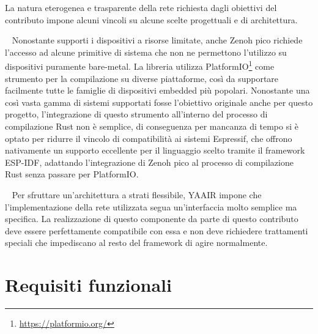 La natura eterogenea e trasparente della rete richiesta dagli obiettivi del
contributo impone alcuni vincoli su alcune scelte progettuali e di architettura.

\begin{constraints}
	~\label{constraint:esp-compatibility}
	Nonostante supporti i dispositivi a risorse limitate, anche Zenoh pico richiede
	l'accesso ad alcune primitive di sistema che non ne permettono l'utilizzo su
	dispositivi puramente bare-metal.
	La libreria utilizza PlatformIO\footnote{\url{https://platformio.org/}}
	come strumento per la compilazione su diverse piattaforme, così da supportare
	facilmente tutte le famiglie di dispositivi embedded più popolari.
	Nonostante una così vasta gamma di sistemi supportati fosse l'obiettivo
	originale anche per questo progetto, l'integrazione di questo strumento all'interno
	del processo di compilazione Rust non è semplice, di conseguenza per
	mancanza di tempo si è optato per ridurre il vincolo di compatibilità ai
	sistemi Espressif, che offrono nativamente un supporto eccellente per il
	linguaggio scelto tramite il framework \ac{ESP-IDF}, adattando l'integrazione
	di Zenoh pico al processo di compilazione Rust senza passare per PlatformIO.

	~\label{constraint:yaair-compatibility}
	Per sfruttare un'architettura a strati flessibile, \ac{YAAIR} impone che
	l'implementazione della rete utilizzata segua un'interfaccia molto semplice
	ma specifica.
	La realizzazione di questo componente da parte di questo contributo deve essere
	perfettamente compatibile con essa e non deve richiedere trattamenti speciali
	che impediscano al resto del framework di agire normalmente.
\end{constraints}

\section{Requisiti funzionali}
\label{sec:functional-requirements}

